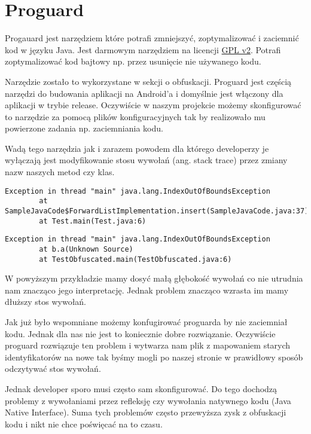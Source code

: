 \documentclass[12pt,a4paper,leqno,oneside,titlepage]{book}
\begin{document}
\section{Proguard}
Progauard jest narzędziem które potrafi zmniejszyć, zoptymalizować i zaciemnić kod w języku Java. Jest darmowym narzędziem na licencji \href{https://en.wikipedia.org/wiki/GNU_General_Public_License#Version_2}{GPL v2}. Potrafi zoptymalizować kod bajtowy np. przez usunięcie nie używanego kodu.\par
Narzędzie zostało to wykorzystane w sekcji o obfuskacji. Proguard jest częścią narzędzi do budowania aplikacji na Android'a i domyślnie jest włączony dla aplikacji w trybie release. Oczywiście w naszym projekcie możemy skonfigurować to narzędzie za pomocą plików konfiguracyjnych tak by realizowało mu powierzone zadania np. zaciemniania kodu.\par
Wadą tego narzędzia jak i zarazem powodem dla którego developerzy je wyłączają jest modyfikowanie stosu wywołań (ang. stack trace) przez zmiany nazw naszych metod czy klas.
%
\begin{lstlisting}[caption={Przykładowy wyjątek dla nie zaciemnionego kodu}]
Exception in thread "main" java.lang.IndexOutOfBoundsException
        at SampleJavaCode$ForwardListImplementation.insert(SampleJavaCode.java:37)
        at Test.main(Test.java:6)
\end{lstlisting}
%
\begin{lstlisting}[caption={Przykładowy wyjątek dla kodu który został zaciemniony}]
Exception in thread "main" java.lang.IndexOutOfBoundsException
        at b.a(Unknown Source)
        at TestObfuscated.main(TestObfuscated.java:6)
\end{lstlisting}
%
W powyższym przykładzie mamy dosyć małą głębokość wywołań co nie utrudnia nam znacząco jego interpretację. Jednak problem znacząco wzrasta im mamy dłuższy stos wywołań.\par
Jak już było wspomniane możemy konfugirować proguarda by nie zaciemniał kodu. Jednak dla nas nie jest to koniecznie dobre rozwiązanie. Oczywiście proguard rozwiązuje ten problem i wytwarza nam plik z mapowaniem starych identyfikatorów na nowe tak byśmy mogli po naszej stronie w prawidłowy sposób odczytywać stos wywołań.
%

%
\par
Jednak developer sporo musi często sam skonfigurować. Do tego dochodzą problemy z wywołaniami przez refleksję czy wywołania natywnego kodu (Java Native Interface). Suma tych problemów często przewyższa zysk z obfuskacji kodu i nikt nie chce poświęcać na to czasu.
\end{document}
